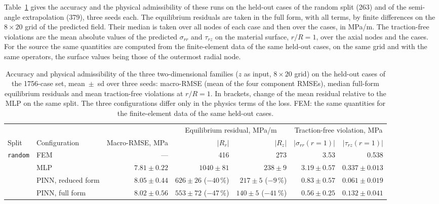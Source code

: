 \documentclass[pdflatex,sn-basic,Numbered]{sn-jnl}
\begin{document}
Table~\ref{tab:admissibility} gives the accuracy and the physical admissibility of these runs on the held-out cases of the random split (263) and of the semi-angle extrapolation (379), three seeds each. The equilibrium residuals are taken in the full form, with all terms, by finite differences on the $8\times20$ grid of the predicted field. Their median is taken over all nodes of each case and then over the cases, in MPa/m. The traction-free violations are the mean absolute values of the predicted $\sigma_{rr}$ and $\tau_{rz}$ on the material surface, $r/R=1$, over the axial nodes and the cases. For the source the same quantities are computed from the finite-element data of the same held-out cases, on the same grid and with the same operators, the surface values being those of the outermost radial node.
\begin{table}
\caption[Accuracy and physical admissibility of the two-dimensional families]{Accuracy and physical admissibility of the three two-dimensional families ($z$ as input, $8\times20$ grid) on the held-out cases of the 1756-case set, mean~$\pm$~sd over three seeds: macro-RMSE (mean of the four component RMSEs), median full-form equilibrium residuals and mean traction-free violations at $r/R=1$. In brackets, change of the mean residual relative to the MLP on the same split. The three configurations differ only in the physics terms of the loss. FEM: the same quantities for the finite-element data of the same held-out cases.}
\label{tab:admissibility}
\centering
\setlength{\tabcolsep}{4pt}
\begin{tabular}{@{}llrrrrr@{}}
\toprule
 & & & \multicolumn{2}{c}{Equilibrium residual, MPa/m} & \multicolumn{2}{c}{Traction-free violation, MPa} \\
\cmidrule(lr){4-5}\cmidrule(lr){6-7}
Split & Configuration & Macro-RMSE, MPa & $|R_r|$ & $|R_z|$ & $|\sigma_{rr}(r{=}1)|$ & $|\tau_{rz}(r{=}1)|$ \\
\midrule
\texttt{random} & FEM                & ---           & 416 & 273 & 3.53 & 0.538 \\
                & MLP                & $7.81\pm0.22$ & $1040\pm81$ & $238\pm9$ & $3.19\pm0.57$ & $0.337\pm0.013$ \\
                & PINN, reduced form & $8.05\pm0.44$ & $626\pm26$ ($-40\,\%$) & $217\pm5$ ($-9\,\%$) & $0.83\pm0.57$ & $0.061\pm0.019$ \\
                & PINN, full form    & $8.02\pm0.56$ & $553\pm72$ ($-47\,\%$) & $140\pm5$ ($-41\,\%$) & $0.56\pm0.25$ & $0.132\pm0.041$ \\

\end{tabular}
\end{table}
\end{document}
